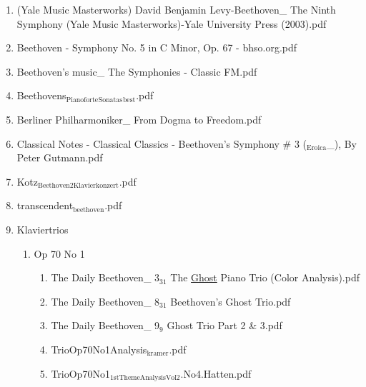 \documentclass[11pt]{article}
\begin{document}
\begin{enumerate}
\begin{enumerate}
\item (Yale Music Masterworks) David Benjamin Levy-Beethoven\_ The Ninth Symphony (Yale Music Masterworks)-Yale University Press (2003).pdf
\label{sec-1-1-1-1-31-7-4-3}

\item Beethoven - Symphony No. 5 in C Minor, Op. 67 - bhso.org.pdf
\label{sec-1-1-1-1-31-7-4-4}

\item Beethoven's music\_ The Symphonies - Classic FM.pdf
\label{sec-1-1-1-1-31-7-4-5}

\item Beethovens$_{\text{Pianoforte}}$$_{\text{Sonatas}}$$_{\text{best}}$.pdf
\label{sec-1-1-1-1-31-7-4-6}

\item Berliner Philharmoniker\_ From Dogma to Freedom.pdf
\label{sec-1-1-1-1-31-7-4-7}

\item Classical Notes - Classical Classics - Beethoven's Symphony \# 3 ($_{\text{Eroica}}$\_), By Peter Gutmann.pdf
\label{sec-1-1-1-1-31-7-4-8}

\item Kotz$_{\text{Beethoven2Klavierkonzert}}$.pdf
\label{sec-1-1-1-1-31-7-4-9}

\item transcendent$_{\text{beethoven}}$.pdf
\label{sec-1-1-1-1-31-7-4-10}

\item Klaviertrios
\label{sec-1-1-1-1-31-7-4-11}
\begin{enumerate}
\item Op 70 No 1
\label{sec-1-1-1-1-31-7-4-11-1}
\begin{enumerate}
\item The Daily Beethoven\_ 3$_{\text{31}}$ The \uline{Ghost} Piano Trio (Color Analysis).pdf
\label{sec-1-1-1-1-31-7-4-11-1-1}

\item The Daily Beethoven\_ 8$_{\text{31}}$ Beethoven's Ghost Trio.pdf
\label{sec-1-1-1-1-31-7-4-11-1-2}

\item The Daily Beethoven\_ 9$_{\text{9}}$ Ghost Trio Part 2 \& 3.pdf
\label{sec-1-1-1-1-31-7-4-11-1-3}

\item TrioOp70No1Analysis$_{\text{kramer}}$.pdf
\label{sec-1-1-1-1-31-7-4-11-1-4}

\item TrioOp70No1$_{\text{1stThemeAnalysisVol2}}$.No4.Hatten.pdf
\label{sec-1-1-1-1-31-7-4-11-1-5}
\end{enumerate}
\end{enumerate}
\end{enumerate}


\end{enumerate}
\end{document}

